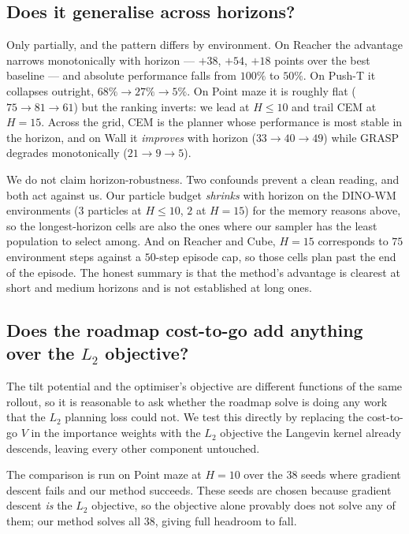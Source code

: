 \subsection{Does it generalise across horizons?}
\label{sec:exp:horizon}

Only partially, and the pattern differs by environment. On Reacher the advantage
narrows monotonically with horizon --- $+38$, $+54$, $+18$ points over the best
baseline --- and absolute performance falls from $100\%$ to $50\%$. On Push-T it
collapses outright, $68\%\to27\%\to5\%$. On Point maze it is roughly flat
($75\to81\to61$) but the ranking inverts: we lead at $H\le10$ and trail CEM at
$H{=}15$. Across the grid, CEM is the planner whose performance is most stable
in the horizon, and on Wall it \emph{improves} with horizon ($33\to40\to49$)
while GRASP degrades monotonically ($21\to9\to5$).

We do not claim horizon-robustness. Two confounds prevent a clean reading, and
both act against us. Our particle budget \emph{shrinks} with horizon on the
DINO-WM environments ($3$ particles at $H\le10$, $2$ at $H{=}15$) for the memory
reasons above, so the longest-horizon cells are also the ones where our sampler
has the least population to select among. And on Reacher and Cube, $H{=}15$
corresponds to $75$ environment steps against a $50$-step episode cap, so those
cells plan past the end of the episode. The honest summary is that the method's
advantage is clearest at short and medium horizons and is not established at
long ones.

\subsection{Does the roadmap cost-to-go add anything over the $L_2$ objective?}
\label{sec:exp:ablation}

The tilt potential and the optimiser's objective are different functions of the
same rollout, so it is reasonable to ask whether the roadmap solve is doing any
work that the $L_2$ planning loss could not. We test this directly by replacing
the cost-to-go $V$ in the importance weights with the $L_2$ objective the
Langevin kernel already descends, leaving every other component untouched.

The comparison is run on Point maze at $H{=}10$ over the $38$ seeds where
gradient descent fails and our method succeeds. These seeds are chosen because
gradient descent \emph{is} the $L_2$ objective, so the objective alone provably
does not solve any of them; our method solves all $38$, giving full headroom to
fall.

